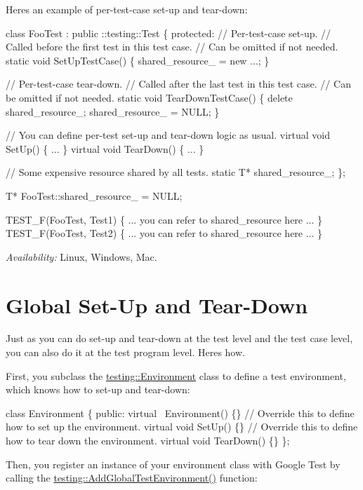 Here\textquotesingle{}s an example of per-\/test-\/case set-\/up and tear-\/down\+: 
\begin{DoxyCode}
class FooTest : public ::testing::Test \{
 protected:
  // Per-test-case set-up.
  // Called before the first test in this test case.
  // Can be omitted if not needed.
  static void SetUpTestCase() \{
    shared\_resource\_ = new ...;
  \}

  // Per-test-case tear-down.
  // Called after the last test in this test case.
  // Can be omitted if not needed.
  static void TearDownTestCase() \{
    delete shared\_resource\_;
    shared\_resource\_ = NULL;
  \}

  // You can define per-test set-up and tear-down logic as usual.
  virtual void SetUp() \{ ... \}
  virtual void TearDown() \{ ... \}

  // Some expensive resource shared by all tests.
  static T* shared\_resource\_;
\};

T* FooTest::shared\_resource\_ = NULL;

TEST\_F(FooTest, Test1) \{
  ... you can refer to shared\_resource here ...
\}
TEST\_F(FooTest, Test2) \{
  ... you can refer to shared\_resource here ...
\}
\end{DoxyCode}


{\itshape Availability\+:} Linux, Windows, Mac.

\section*{Global Set-\/\+Up and Tear-\/\+Down}

Just as you can do set-\/up and tear-\/down at the test level and the test case level, you can also do it at the test program level. Here\textquotesingle{}s how.

First, you subclass the {\ttfamily \hyperlink{classtesting_1_1_environment}{testing\+::\+Environment}} class to define a test environment, which knows how to set-\/up and tear-\/down\+:


\begin{DoxyCode}
class Environment \{
 public:
  virtual ~Environment() \{\}
  // Override this to define how to set up the environment.
  virtual void SetUp() \{\}
  // Override this to define how to tear down the environment.
  virtual void TearDown() \{\}
\};
\end{DoxyCode}


Then, you register an instance of your environment class with Google Test by calling the {\ttfamily \hyperlink{namespacetesting_a460d7b998622e332392c1e00be3a60d5}{testing\+::\+Add\+Global\+Test\+Environment()}} function\+:


